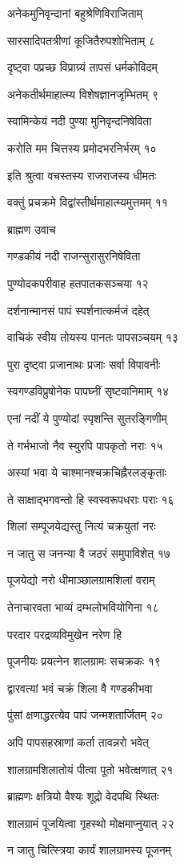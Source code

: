 अनेकमुनिवृन्दानां बहुश्रेणिविराजिताम्

सारसादिपतत्रीणां कूजितैरुपशोभिताम् ८

दृष्ट्वा पप्रच्छ विप्राग्र्यं तापसं धर्मकोविदम्

अनेकतीर्थमाहात्म्य विशेषज्ञानजृम्भितम् ९

स्वामिन्केयं नदी पुण्या मुनिवृन्दनिषेविता

करोति मम चित्तस्य प्रमोदभरनिर्भरम् १०

इति श्रुत्वा वचस्तस्य राजराजस्य धीमतः

वक्तुं प्रचक्रमे विद्वांस्तीर्थमाहात्म्यमुत्तमम् ११

ब्राह्मण उवाच

गण्डकीयं नदी राजन्सुरासुरनिषेविता

पुण्योदकपरीवाह हतपातकसञ्चया १२

दर्शनान्मानसं पापं स्पर्शनात्कर्मजं दहेत्

वाचिकं स्वीय तोयस्य पानतः पापसञ्चयम् १३

पुरा दृष्ट्वा प्रजानाथः प्रजाः सर्वा विपावनीः

स्वगण्डविप्रुषोनेक पापघ्नीं सृष्टवानिमाम् १४

एनां नदीं ये पुण्योदां स्पृशन्ति सुतरङ्गिणीम्

ते गर्भभाजो नैव स्युरपि पापकृतो नराः १५

अस्यां भवा ये चाश्मानश्चक्रचिह्नैरलङ्कृताः

ते साक्षाद्भगवन्तो हि स्वस्वरूपधराः पराः १६

शिलां सम्पूजयेद्यस्तु नित्यं चक्रयुतां नरः

न जातु स जनन्या वै जठरं समुपाविशेत् १७

पूजयेद्यो नरो धीमाञ्छालग्रामशिलां वराम्

तेनाचारवता भाव्यं दम्भलोभवियोगिना १८

परदार परद्रव्यविमुखेन नरेण हि

पूजनीयः प्रयत्नेन शालग्रामः सचक्रकः १९

द्वारवत्यां भवं चक्रं शिला वै गण्डकीभवा

पुंसां क्षणाद्धरत्येव पापं जन्मशतार्जितम् २०

अपि पापसहस्राणां कर्ता तावन्नरो भवेत्

शालग्रामशिलातोयं पीत्वा पूतो भवेत्क्षणात् २१

ब्राह्मणः क्षत्रियो वैश्यः शूद्रो वेदपथि स्थितः

शालग्रामं पूजयित्वा गृहस्थो मोक्षमाप्नुयात् २२

न जातु चित्स्त्रिया कार्यं शालग्रामस्य पूजनम्

